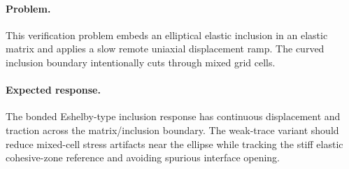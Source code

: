 \paragraph{Problem.}
This verification problem embeds an elliptical elastic inclusion in an elastic
matrix and applies a slow remote uniaxial displacement ramp.  The curved
inclusion boundary intentionally cuts through mixed grid cells.

\paragraph{Expected response.}
The bonded Eshelby-type inclusion response has continuous displacement and
traction across the matrix/inclusion boundary.  The weak-trace variant should
reduce mixed-cell stress artifacts near the ellipse while tracking the stiff
elastic cohesive-zone reference and avoiding spurious interface opening.

